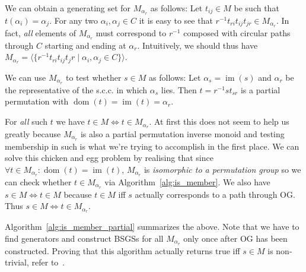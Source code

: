 We can obtain a generating set for $M_{\alpha_r}$ as follows: Let $t_{ij}
\in M$ be such that $t(\alpha_i) = \alpha_j$.
%
For any two $\alpha_i, \alpha_j \in C$ it is easy to see that $r^{-1} t_{ri}
t_{ij} t_{jr} \in M_{\alpha_r}$. In fact, \textit{all} elements of
$M_{\alpha_r}$ must correspond to $r^{-1}$ composed with circular paths through
$C$ starting and ending at $\alpha_r$. Intuitively, we should thus have
$M_{\alpha_r} = \langle\{r^{-1} t_{ri} t_{ij} t_jr \mid \alpha_i,\alpha_j \in
C\}\rangle$.

We can use $M_{\alpha_r}$ to test whether $s \in M$ as follows: Let $\alpha_s =
\operatorname{im}(s)$ and $\alpha_r$ be the representative of the s.c.c. in
which $\alpha_s$ lies. Then $t = r^{-1} s t_{sr}$ is a partial permutation with
$\operatorname{dom}(t) = \operatorname{im}(t) = \alpha_r$.

For \textit{all} such $t$ we have $t \in M \iff t \in M_{\alpha_r}$. At first
this does not seem to help us greatly because $M_{\alpha_r}$ is also a partial
permutation inverse monoid and testing membership in such is what we're trying
to accomplish in the first place. We can solve this chicken and egg problem by
realising that since $\forall t \in M_{\alpha_r}: \operatorname{dom}(t) =
\operatorname{im}(t)$, $M_{\alpha_r}$ is \textit{isomorphic to a permutation
group} so we can check whether $t \in M_{\alpha_r}$ via
Algorithm~\ref{alg:is_member}. We also have $s \in M \iff t \in M$
because $t \in M$ iff $s$ actually corresponds to a path through
$\mathrm{OG}$. Thus $s \in M \iff t \in M_{\alpha_r}$.

Algorithm~\ref{alg:is_member_partial} summarizes the above. Note that we have
to find generators and construct BSGSs for all $M_{\alpha_r}$ only once after
$\mathrm{OG}$ has been constructed.  Proving that this algorithm actually
returns $\mathrm{true}$ iff $s \in M$ is non-trivial, refer to~\cite{Mitchell}.

